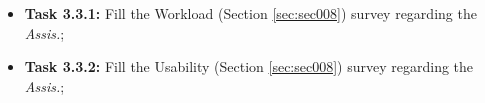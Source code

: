 \hfill

\begin{itemize}
\item[] \textbf{Task 3.3.1:} Fill the Workload (Section \ref{sec:sec008}) survey regarding the \textit{Assis.};
\item[] \textbf{Task 3.3.2:} Fill the Usability (Section \ref{sec:sec008}) survey regarding the \textit{Assis.};
\end{itemize}

\hfill

